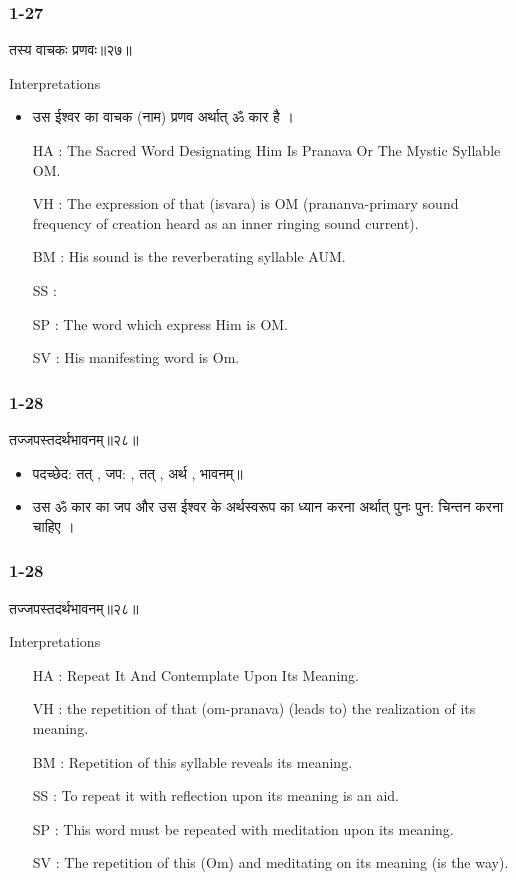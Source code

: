 \begin{frame}[fragile]\frametitle{1-27}
\begin{sanskrit}
तस्य वाचकः प्रणवः॥२७॥
\end{sanskrit}

Interpretations
\begin{itemize}	
\item उस ईश्वर का वाचक (नाम) प्रणव अर्थात् ॐ कार है ।
\item [HA]: The Sacred Word Designating Him Is Pranava Or The Mystic Syllable OM.
\item [VH]: The expression of that (isvara) is OM (prananva-primary sound frequency of creation heard as an inner ringing sound current).
\item [BM]: His sound is the reverberating syllable AUM.
\item [SS]:
\item [SP]: The word which express Him is OM.
\item [SV]: His manifesting word is Om. 
\end{itemize}
	
\end{frame}


\begin{frame}[fragile]\frametitle{1-28}
\begin{sanskrit}
तज्जपस्तदर्थभावनम्॥२८॥
\end{sanskrit}

\begin{itemize}
\item पदच्छेद: तत् , जप: , तत् , अर्थ , भावनम्॥
\item उस ॐ कार का जप और उस ईश्वर के अर्थस्वरूप का ध्यान करना अर्थात् पुनः पुन: चिन्तन करना चाहिए ।
\end{itemize}
	
\end{frame}

\begin{frame}[fragile]\frametitle{1-28}
\begin{sanskrit}
तज्जपस्तदर्थभावनम्॥२८॥
\end{sanskrit}

Interpretations
\begin{itemize}	
\item [HA]: Repeat It And Contemplate Upon Its Meaning.
\item [VH]: the repetition of that (om-pranava) (leads to) the realization of its meaning.
\item [BM]: Repetition of this syllable reveals its meaning.
\item [SS]: To repeat it with reflection upon its meaning is an aid.
\item [SP]: This word must be repeated with meditation upon its meaning.
\item [SV]: The repetition of this (Om) and meditating on its meaning (is the way). 
\end{itemize}
	
\end{frame}


